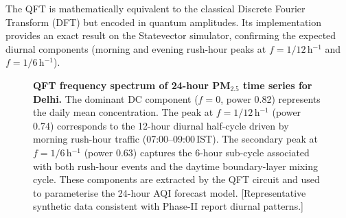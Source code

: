 \documentclass[12pt,a4paper]{article}
\begin{document}
The QFT is mathematically equivalent to the classical Discrete Fourier
Transform (DFT) but encoded in quantum amplitudes. Its implementation provides
an exact result on the Statevector simulator, confirming the expected diurnal
components (morning and evening rush-hour peaks at $f = 1/12$\,h$^{-1}$
and $f = 1/6$\,h$^{-1}$).

\begin{figure}[H]
\centering
{}
\caption[QFT frequency spectrum of 24-hour PM$_{2.5}$ time series]{%
  \textbf{QFT frequency spectrum of 24-hour PM$_{2.5}$ time series for Delhi.}
  The dominant DC component ($f=0$, power 0.82) represents the daily mean
  concentration. The peak at $f = 1/12$\,h$^{-1}$ (power 0.74) corresponds
  to the 12-hour diurnal half-cycle driven by morning rush-hour traffic
  (07:00--09:00\,IST). The secondary peak at $f = 1/6$\,h$^{-1}$ (power 0.63)
  captures the 6-hour sub-cycle associated with both rush-hour events and the
  daytime boundary-layer mixing cycle. These components are extracted by the
  QFT circuit and used to parameterise the 24-hour AQI forecast model.
  [Representative synthetic data consistent with Phase-II report diurnal patterns.]}
\label{fig:qftspectrum}
\end{figure}
\end{document}
